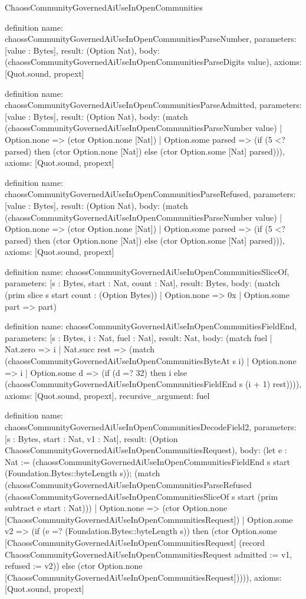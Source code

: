 \begin{lexlean}{ChaossCommunityGovernedAiUseInOpenCommunities}
\begin{semanticmodule}
definition{
  name: chaossCommunityGovernedAiUseInOpenCommunitiesParseNumber,
  parameters: [value : Bytes],
  result: (Option Nat),
  body: (chaossCommunityGovernedAiUseInOpenCommunitiesParseDigits value),
  axioms: [Quot.sound, propext]
}

definition{
  name: chaossCommunityGovernedAiUseInOpenCommunitiesParseAdmitted,
  parameters: [value : Bytes],
  result: (Option Nat),
  body: (match (chaossCommunityGovernedAiUseInOpenCommunitiesParseNumber value)
    | Option.none => (ctor Option.none [Nat])
    | Option.some parsed => (if (5 <? parsed) then (ctor Option.none [Nat]) else (ctor Option.some [Nat] parsed))),
  axioms: [Quot.sound, propext]
}

definition{
  name: chaossCommunityGovernedAiUseInOpenCommunitiesParseRefused,
  parameters: [value : Bytes],
  result: (Option Nat),
  body: (match (chaossCommunityGovernedAiUseInOpenCommunitiesParseNumber value)
    | Option.none => (ctor Option.none [Nat])
    | Option.some parsed => (if (5 <? parsed) then (ctor Option.none [Nat]) else (ctor Option.some [Nat] parsed))),
  axioms: [Quot.sound, propext]
}

definition{
  name: chaossCommunityGovernedAiUseInOpenCommunitiesSliceOf,
  parameters: [s : Bytes, start : Nat, count : Nat],
  result: Bytes,
  body: (match (prim slice s start count : (Option Bytes))
    | Option.none => 0x
    | Option.some part => part)
}

definition{
  name: chaossCommunityGovernedAiUseInOpenCommunitiesFieldEnd,
  parameters: [s : Bytes, i : Nat, fuel : Nat],
  result: Nat,
  body: (match fuel
    | Nat.zero => i
    | Nat.succ rest => (match (chaossCommunityGovernedAiUseInOpenCommunitiesByteAt s i)
      | Option.none => i
      | Option.some d => (if (d =? 32) then i else (chaossCommunityGovernedAiUseInOpenCommunitiesFieldEnd s (i + 1) rest)))),
  axioms: [Quot.sound, propext],
  recursive_argument: fuel
}

definition{
  name: chaossCommunityGovernedAiUseInOpenCommunitiesDecodeField2,
  parameters: [s : Bytes, start : Nat, v1 : Nat],
  result: (Option ChaossCommunityGovernedAiUseInOpenCommunitiesRequest),
  body: (let e : Nat := (chaossCommunityGovernedAiUseInOpenCommunitiesFieldEnd s start (Foundation.Bytes::byteLength s)); (match (chaossCommunityGovernedAiUseInOpenCommunitiesParseRefused (chaossCommunityGovernedAiUseInOpenCommunitiesSliceOf s start (prim subtract e start : Nat)))
    | Option.none => (ctor Option.none [ChaossCommunityGovernedAiUseInOpenCommunitiesRequest])
    | Option.some v2 => (if (e =? (Foundation.Bytes::byteLength s)) then (ctor Option.some [ChaossCommunityGovernedAiUseInOpenCommunitiesRequest] (record ChaossCommunityGovernedAiUseInOpenCommunitiesRequest {admitted := v1, refused := v2})) else (ctor Option.none [ChaossCommunityGovernedAiUseInOpenCommunitiesRequest])))),
  axioms: [Quot.sound, propext]
}


\end{semanticmodule}
\end{lexlean}
